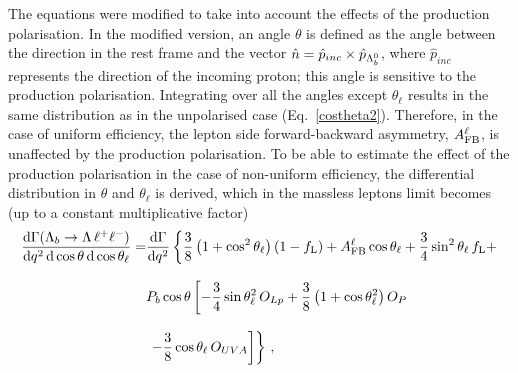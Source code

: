 The equations were modified to take into account the effects of the production polarisation.
%
In the modified version, an angle $\theta$ is defined as the angle between the \Lz direction
in the \Lb rest frame and the vector $\hat{n} = \hat{p}_{inc} \times \hat{p}_{\Lambda^0_b}$, where $\hat{p}_{inc}$
represents the direction of the incoming proton; this angle is sensitive to the production polarisation.
Integrating over all the angles except $\theta_\ell$ results in 
the same distribution as in the unpolarised case (Eq.~\ref{costheta2}). Therefore, in the case of uniform
efficiency, the lepton side forward-backward asymmetry, $A_{\rm FB}^\ell$, is unaffected by the production
polarisation. To be able to estimate the effect of the production polarisation in the case of non-uniform efficiency, 
the differential distribution in $\theta$ and $\theta_\ell$ is derived, which in the massless leptons
limit becomes (up to a  constant multiplicative factor)
%
\begin{align}
\renewcommand{\arraystretch}{1.5}
\frac{\mathrm{d}\Gamma(\Lambda_{b}\to \Lambda \,\ell^{+}\ell^{-})}{\mathrm{d}\qsq\,\mathrm{d}\cos\theta\, \mathrm{d}\cos\theta_\ell}=&
\frac{\mathrm{d}\Gamma}{\mathrm{d}\qsq}\left\{  \frac{3}{8}\left(1+\cos^2\theta_\ell\right)(1-\fl)+\afbl\cos\theta_\ell +
   \frac{3}{4}\sin^2\theta_\ell \,\fl+\right. \nonumber \\[8pt]
&P_b\cos\theta\left[ -\frac{3}{4}\sin\theta_\ell^2\,O_{Lp}+
  \frac{3}{8}\left(1+\cos\theta_\ell^2\right)O_P\right. \nonumber \\[8pt]
&\left.\left.-\frac{3}{8}\cos\theta_\ell\,O_{UVA} \right]\right\}\,,
\label{eq:lepton2D}
\end{align}
